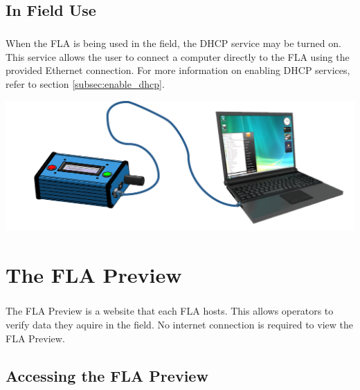 \documentclass[11pt, oneside]{book}
\begin{document}
\section{In Field Use}\label{setting_fla_in_field}
\paragraph{  }
When the FLA is being used in the field, the DHCP service may be turned on. This service allows the user to connect a computer directly to the FLA using the provided Ethernet connection. For more information on enabling DHCP services, refer to section \ref{subsec:enable_dhcp}.
\begin{center}
\includegraphics[width=.9\linewidth]{../media/graphics/fla_in_field}
\end{center}


\chapter{The FLA Preview}\label{sec:fla_preview}
\paragraph{  }
The FLA Preview is a website that each FLA hosts. This allows operators
to verify data they aquire in the field. No internet connection is required to
view the FLA Preview.


\section{Accessing the FLA Preview}
\end{document}
